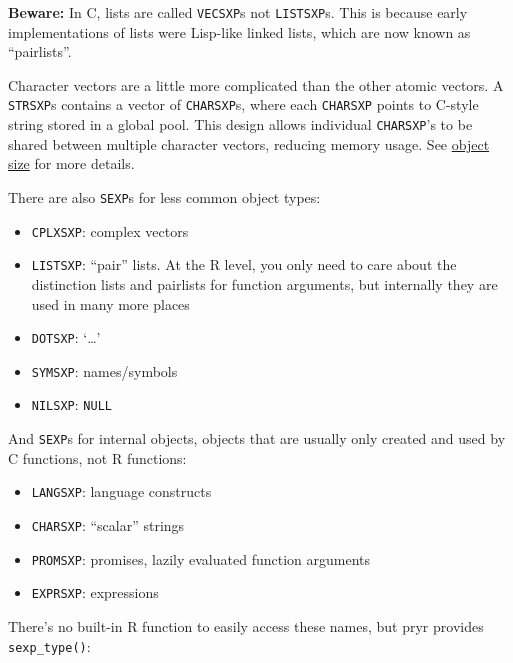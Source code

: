 \textbf{Beware:} In C, lists are called \texttt{VECSXP}s not
\texttt{LISTSXP}s. This is because early implementations of lists were
Lisp-like linked lists, which are now known as ``pairlists''.

Character vectors are a little more complicated than the other atomic
vectors. A \texttt{STRSXP}s contains a vector of \texttt{CHARSXP}s,
where each \texttt{CHARSXP} points to C-style string stored in a global
pool. This design allows individual \texttt{CHARSXP}'s to be shared
between multiple character vectors, reducing memory usage. See
\protect\hyperlink{object-size}{object size} for more details.

There are also \texttt{SEXP}s for less common object types:

\begin{itemize}
\tightlist
\item
  \texttt{CPLXSXP}: complex vectors
\item
  \texttt{LISTSXP}: ``pair'' lists. At the R level, you only need to
  care about the distinction lists and pairlists for function arguments,
  but internally they are used in many more places
\item
  \texttt{DOTSXP}: `\ldots{}'
\item
  \texttt{SYMSXP}: names/symbols
\item
  \texttt{NILSXP}: \texttt{NULL}
\end{itemize}

And \texttt{SEXP}s for internal objects, objects that are usually only
created and used by C functions, not R functions:

\begin{itemize}
\tightlist
\item
  \texttt{LANGSXP}: language constructs
\item
  \texttt{CHARSXP}: ``scalar'' strings
\item
  \texttt{PROMSXP}: promises, lazily evaluated function arguments
\item
  \texttt{EXPRSXP}: expressions
\end{itemize}

There's no built-in R function to easily access these names, but pryr
provides \texttt{sexp\_type()}:

\begin{Shaded}
\begin{Highlighting}[]
\end{Highlighting}
\end{Shaded}

